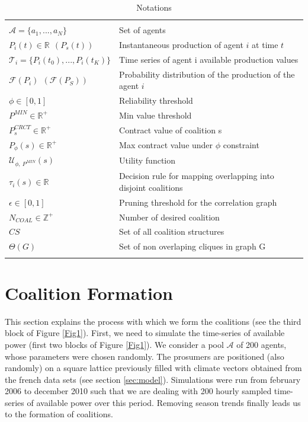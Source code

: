\documentclass[conference]{IEEEtran}
\begin{document}
\begin{table}[!t]
\centering
\scriptsize
\begin{tabular}{l|p{4.5cm}}
  \hline 
  \\
  $ \mathcal{A}=\{a_{1},...,a_{N}\} $ & Set of agents \\
  $ P_{i}(t) \in \mathbb{R}\ \ (P_{s}(t)) $ & Instantaneous production of agent $i$ at time $t$ \\
  $ \mathcal{T}_{i} = \{P_{i}(t_{0}),...,P_{i}(t_{K})\} $ & Time series of agent i available production values \\
  $ \mathcal{F}(P_{i})\ \ (\mathcal{F}(P_{S})) $ & Probability distribution of the production of the agent $i$ \\
  $ \phi \in [0,1] $ & Reliability threshold \\
  $ P^{MIN} \in \mathbb{R}^+ $ & Min value threshold \\
  $ P_{s}^{CRCT} \in \mathbb{R}^+ $ & Contract value of coalition s \\
  $ P_{\phi}(s) \in \mathbb{R}^+ $ & Max contract value under $ \phi $ constraint \\
  $ \mathcal{U}_{\phi,\ P^{MIN}}(s) $ & Utility function \\
  $ \tau_{i}(s) \in \mathbb{R}$ & Decision rule for mapping overlapping into disjoint coalitions \\
  $ \epsilon \in [0,1] $ & Pruning threshold for the correlation graph \\
  $ N_{COAL} \in \mathbb{Z}^+ $ & Number of desired coalition \\
  $ CS $ & Set of all coalition structures \\
  $ \Theta(G) $ & Set of non overlaping cliques in graph G \\
  \\
  \hline
\end{tabular}

\caption{Notations\label{table1}}
\end{table}


%
%

\section{Coalition Formation}
\label{sec:forming}

This section explains the process with which we form the coalitions (see the third block of Figure \ref{Fig1}). First, we need to simulate the time-series of available power (first two blocks of Figure \ref{Fig1}). We consider a pool $ \mathcal{A} $ of 200 agents, whose parameters were chosen randomly. The prosumers are positioned (also randomly) on a square lattice previously filled with climate vectors obtained from the french data sets (see section \ref{sec:model}). Simulations were run from february 2006 to december 2010 such that we are dealing with 200 hourly sampled time-series of available power over this period. Removing season trends finally leads us to the formation of coalitions. 
\end{document}
